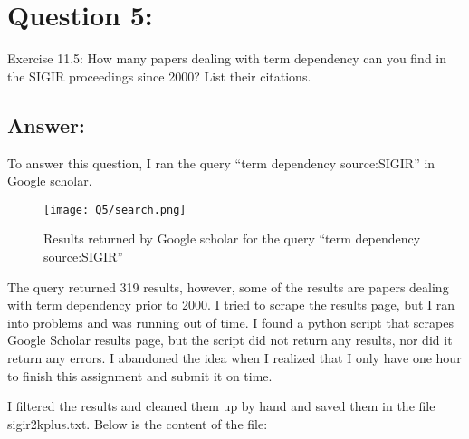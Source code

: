 \section*{Question 5:}
Exercise 11.5:
How many papers dealing with term dependency can you find in the SIGIR proceedings since 2000? List their citations.

\subsection*{Answer:}
To answer this question, I ran the query ``term dependency source:SIGIR'' in Google scholar. 

\begin{figure}[h]
\caption{Results returned by Google scholar for the query ``term dependency source:SIGIR''}
\centering
\texttt{[image: Q5/search.png]}
\end{figure}

The query returned 319 results, however, some of the results are papers dealing with term dependency prior to 2000. I tried to scrape the results page, but I ran into problems and was running out of time. I found a python script that scrapes Google Scholar results page, but the script did not return any results, nor did it return any errors. I abandoned the idea when I realized that I only have one hour to finish this assignment and submit it on time. 

I filtered the results and cleaned them up by hand and saved them in the file sigir2kplus.txt. Below is the content of the file:




